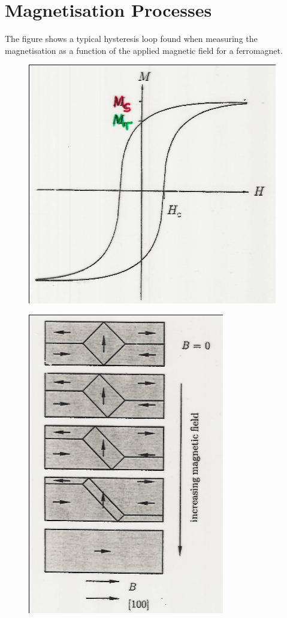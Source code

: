 \documentclass[a4paper, 11pt, normalem]{report}
\begin{document}
\section{Magnetisation Processes}
The figure shows a typical hysteresis loop found when measuring the magnetisation as a function of the applied magnetic field for a ferromagnet.
\begin{figure}[H]
    \centering
    \includegraphics[scale=0.5]{process.png}
\end{figure}
\begin{figure}
    \centering
    \includegraphics[scale=0.35]{incmag.png}
\end{figure}
\end{document}
